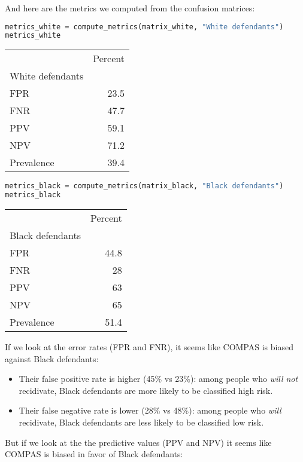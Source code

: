 \pagebreak

And here are the metrics we computed from the confusion matrices:

\begin{lstlisting}[language=Python,style=source]
metrics_white = compute_metrics(matrix_white, "White defendants")
metrics_white
\end{lstlisting}

\begin{tabular}{lr}
\toprule
 & Percent \\
White defendants &  \\
\midrule
FPR & 23.5 \\
FNR & 47.7 \\
PPV & 59.1 \\
NPV & 71.2 \\
Prevalence & 39.4 \\
\bottomrule
\end{tabular}

\begin{lstlisting}[language=Python,style=source]
metrics_black = compute_metrics(matrix_black, "Black defendants")
metrics_black
\end{lstlisting}

\begin{tabular}{lr}
\toprule
 & Percent \\
Black defendants &  \\
\midrule
FPR & 44.8 \\
FNR & 28 \\
PPV & 63 \\
NPV & 65 \\
Prevalence & 51.4 \\
\bottomrule
\end{tabular}

If we look at the error rates (FPR and FNR), it seems like COMPAS is
biased against Black defendants:

\begin{itemize}
\item
  Their false positive rate is higher (45\% vs 23\%): among people who
  \emph{will not} recidivate, Black defendants are more likely to be
  classified high risk.
\item
  Their false negative rate is lower (28\% vs 48\%): among people who
  \emph{will} recidivate, Black defendants are less likely to be
  classified low risk.
\end{itemize}

But if we look at the the predictive values (PPV and NPV) it seems like
COMPAS is biased in favor of Black defendants:

